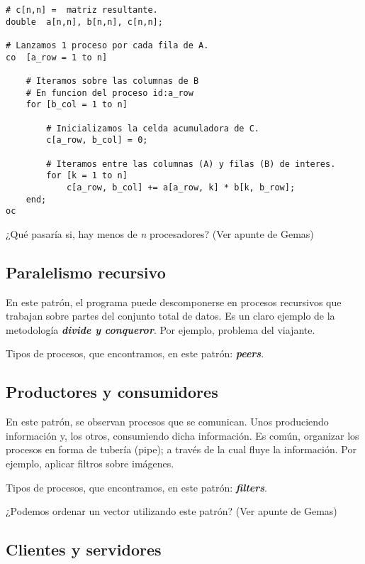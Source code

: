 \documentclass[a4paper, 10pt]{report}
\begin{document}
\begin{lstlisting}
# c[n,n] =  matriz resultante.
double  a[n,n], b[n,n], c[n,n];

# Lanzamos 1 proceso por cada fila de A.
co  [a_row = 1 to n]

	# Iteramos sobre las columnas de B
	# En funcion del proceso id:a_row
	for [b_col = 1 to n]
		
		# Inicializamos la celda acumuladora de C.
		c[a_row, b_col] = 0;

		# Iteramos entre las columnas (A) y filas (B) de interes.
		for [k = 1 to n]
			c[a_row, b_col] += a[a_row, k] * b[k, b_row];
	end;
oc 
\end{lstlisting}

\begin{basic_box}
 ¿Qué pasaría si, hay menos de \emph{n} procesadores? (Ver apunte de Gemas)
\end{basic_box}



\subsection{Paralelismo recursivo}

En este patrón, el programa puede descomponerse en procesos recursivos que trabajan sobre partes del conjunto total de datos. Es un claro ejemplo de la metodología \textbf{\emph{divide y conqueror}}.
Por ejemplo, problema del viajante.

Tipos de procesos, que encontramos, en este patrón: \textbf{\emph{peers}}.

\subsection{Productores y consumidores}

En este patrón, se observan procesos que se comunican. Unos produciendo información y, los otros, consumiendo dicha información. Es común, organizar los procesos en forma de tubería (pipe); a través de la cual fluye la información.
Por ejemplo, aplicar filtros sobre imágenes.

Tipos de procesos, que encontramos, en este patrón: \textbf{\emph{filters}}.

\begin{basic_box}
	 ¿Podemos ordenar un vector utilizando este patrón? (Ver apunte de Gemas)
\end{basic_box}

\subsection{Clientes y servidores}
\end{document}
